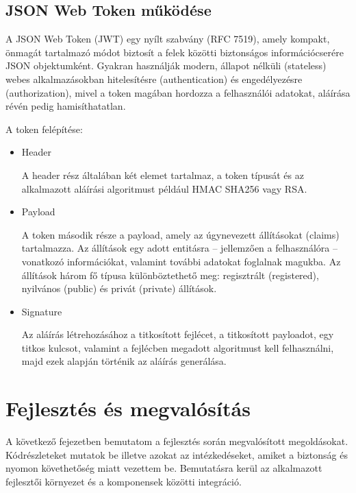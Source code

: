 \documentclass[
]{thesis-ekf}
\theoremstyle{definition}
\theoremstyle{remark}
\begin{document}


\section{JSON Web Token működése}

A JSON Web Token (JWT) egy nyílt szabvány (RFC 7519), amely kompakt, önmagát tartalmazó módot biztosít a felek közötti biztonságos információcserére JSON objektumként. Gyakran használják modern, állapot nélküli (stateless) webes alkalmazásokban hitelesítésre (authentication) és engedélyezésre (authorization), mivel a token magában hordozza a felhasználói adatokat, aláírása révén pedig hamisíthatatlan. \cite{JWT} 

A token felépítése:
\begin{itemize}
	\item Header
	
	A header rész általában két elemet tartalmaz, a token típusát és az alkalmazott aláírási algoritmust például HMAC SHA256 vagy RSA.
		
	\item Payload
	
	A token második része a payload, amely az úgynevezett állításokat (claims) tartalmazza. Az állítások egy adott entitásra -- jellemzően a felhasználóra -- vonatkozó információkat, valamint további adatokat foglalnak magukba. Az állítások három fő típusa különböztethető meg: regisztrált (registered), nyilvános (public) és privát (private) állítások.
	
	\item Signature
	
	Az aláírás létrehozásához a titkosított fejlécet, a titkosított payloadot, egy titkos kulcsot, valamint a fejlécben megadott algoritmust kell felhasználni, majd ezek alapján történik az aláírás generálása.
	
\end{itemize}

\chapter{Fejlesztés és megvalósítás}

A következő fejezetben bemutatom a fejlesztés során megvalósított megoldásokat. Kódrészleteket mutatok be illetve azokat az intézkedéseket, amiket a biztonság és nyomon követhetőség miatt vezettem be.
Bemutatásra kerül az alkalmazott fejlesztői környezet és a komponensek közötti integráció.
\end{document}

